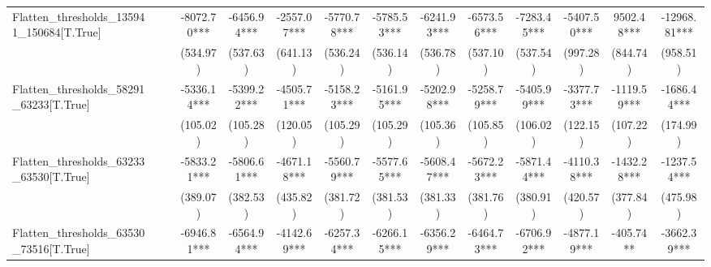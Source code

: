 \begin{subappendices}
{\begin{landscape}
\begin{table}[H]
{\begin{tabular}{lccccccccccccc}
Flatten_thresholds_135941_150684[T.True] &                    &                         & -8072.70***                      & -6456.94*** & -2557.07***              & -5770.78***       & -5785.53*** & -6241.93***          & -6573.56***             & -7283.45***              & -5407.50***           & 9502.48***                & -12968.81***               \\
                                         &                    &                         & (534.97)                         & (537.63)    & (641.13)                 & (536.24)          & (536.14)    & (536.78)             & (537.10)                & (537.54)                 & (997.28)              & (844.74)                  & (958.51)                   \\
Flatten_thresholds_58291_63233[T.True]   &                    &                         & -5336.14***                      & -5399.22*** & -4505.71***              & -5158.23***       & -5161.95*** & -5202.98***          & -5258.79***             & -5405.99***              & -3377.73***           & -1119.59***               & -1686.44***                \\
                                         &                    &                         & (105.02)                         & (105.28)    & (120.05)                 & (105.29)          & (105.29)    & (105.36)             & (105.85)                & (106.02)                 & (122.15)              & (107.22)                  & (174.99)                   \\
Flatten_thresholds_63233_63530[T.True]   &                    &                         & -5833.21***                      & -5806.61*** & -4671.18***              & -5560.79***       & -5577.65*** & -5608.47***          & -5672.23***             & -5871.44***              & -4110.38***           & -1432.28***               & -1237.54***                \\
                                         &                    &                         & (389.07)                         & (382.53)    & (435.82)                 & (381.72)          & (381.53)    & (381.33)             & (381.76)                & (380.91)                 & (420.57)              & (377.84)                  & (475.98)                   \\
Flatten_thresholds_63530_73516[T.True]   &                    &                         & -6946.81***                      & -6564.94*** & -4142.69***              & -6257.34***       & -6266.15*** & -6356.29***          & -6464.73***             & -6706.92***              & -4877.19***           & -405.74**                 & -3662.39***                \\

\end{tabular}}
\end{table}
\end{landscape}}
\end{subappendices}
